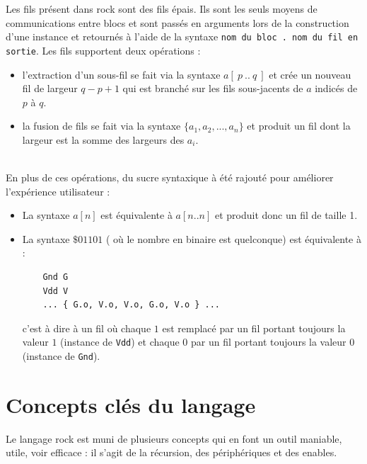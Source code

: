 \documentclass[13pt]{article}
\begin{document}
Les fils présent dans rock sont des fils épais. Ils sont les seuls moyens de
communications entre blocs et sont passés en arguments lors de la construction
d'une instance et retournés à l'aide de la syntaxe \texttt{nom du bloc . nom du
  fil en sortie}.
Les fils supportent deux opérations :
\begin{itemize}
\item l'extraction d'un sous-fil se fait via la syntaxe $a[\ p\ ..\ q\ ]$ et crée
  un nouveau fil de largeur $q - p + 1$ qui est branché sur les fils sous-jacents
  de $a$ indicés de $p$ à $q$.
\item la fusion de fils se fait via la syntaxe $\{ a_1, a_2, ..., a_n \}$ et
  produit un fil dont la largeur est la somme des largeurs des $a_i$.
\end{itemize} 
\text{}\\
En plus de ces opérations, du sucre syntaxique à été rajouté pour améliorer
l'expérience utilisateur :
\begin{itemize}
\item La syntaxe $a[n]$ est équivalente à $a[n..n]$ et produit donc un fil de
  taille 1.
\item La syntaxe $\$01101$ ( où le nombre en binaire est quelconque) est
  équivalente à :
\begin{verbatim}
    Gnd G
    Vdd V
    ... { G.o, V.o, V.o, G.o, V.o } ...
\end{verbatim}
  c'est à dire à un fil où chaque $1$ est remplacé par un fil portant toujours
  la valeur $1$ (instance de \texttt{Vdd}) et chaque $0$ par un fil portant
  toujours la valeur $0$ (instance de \texttt{Gnd}). 
\end{itemize}


\section{Concepts clés du langage}

Le langage rock est muni de plusieurs concepts qui en font un outil maniable,
utile, voir efficace : il s'agit de la récursion, des périphériques et des enables.
\end{document}
